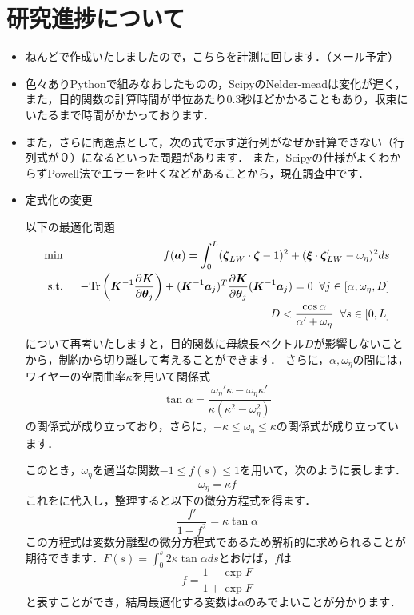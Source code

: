 \documentclass[11pt]{jsarticle}
\begin{document}
	\section{研究進捗について}
		\begin{itemize}
			\item ねんどで作成いたしましたので，こちらを計測に回します．（メール予定）
			\item 色々ありPythonで組みなおしたものの，ScipyのNelder-meadは変化が遅く，また，目的関数の計算時間が単位あたり0.3秒ほどかかることもあり，収束にいたるまで時間がかかっております．
			\item また，さらに問題点として，次の式で示す逆行列がなぜか計算できない（行列式が０）になるといった問題があります．
			また，Scipyの仕様がよくわからずPowell法でエラーを吐くなどがあることから，現在調査中です．
			\item 定式化の変更
			
			以下の最適化問題
			\begin{eqnarray}
				\min \;\; &&f(\boldsymbol{a}) = \int_{0}^{L} (\boldsymbol{\zeta}_{LW} \cdot \boldsymbol{\zeta} -1 )^2 + (\boldsymbol{\xi} \cdot \boldsymbol{\zeta}_{LW}' - \omega_{\eta})^2 ds  \\
				\mathrm{s.t.} \;\;&& -\mathrm{Tr}\left( \boldsymbol{K}^{-1} \frac{\partial \boldsymbol{K}}{\partial \boldsymbol{\theta}_{j}} \right) + (\boldsymbol{K}^{-1} \boldsymbol{a}_j)^T \frac{\partial \boldsymbol{K}}{\partial \boldsymbol{\theta}_{j}} (\boldsymbol{K}^{-1} \boldsymbol{a}_j) = 0\;\; \forall j \in [\alpha,\omega_{\eta},D] \\
				&& D<\frac{\cos \alpha}{\alpha'+\omega_{\eta}} \;\; \forall s \in [0,L]
			\end{eqnarray}
			について再考いたしますと，目的関数に母線長ベクトル$ D $が影響しないことから，制約から切り離して考えることができます．
			さらに，$ \alpha,\omega_{\eta} $の間には，ワイヤーの空間曲率$ \kappa $を用いて関係式
			\begin{equation}\label{eq:omgEta_and_alpha}
				\tan \alpha = \frac{\omega_{\eta}' \kappa - \omega_{\eta} \kappa'}{\kappa (\kappa^2 - \omega_{\eta}^2)}
			\end{equation}
			の関係式が成り立っており，さらに，$ -\kappa \leq \omega_{\eta} \leq \kappa $の関係式が成り立っています．
			
			このとき，$ \omega_{\eta} $を適当な関数$ -1 \leq f(s)  \leq 1$を用いて，次のように表します．
			\begin{equation}\label{eq:feq}
				\omega_{\eta} = \kappa f
			\end{equation}
			これをに代入し，整理すると以下の微分方程式を得ます．
			\begin{equation}\label{eq:f_ode}
				\frac{f'}{1-f^2} = \kappa \tan \alpha
			\end{equation}
			この方程式は変数分離型の微分方程式であるため解析的に求められることが期待できます．$ F(s) = \int_{0}^{s} 2 \kappa \tan \alpha ds$とおけば，$ f $は
			\begin{equation}\label{eq:f_solve}
				f = \frac{1-\exp F}{1+\exp F}
			\end{equation}
			と表すことができ，結局最適化する変数は$ \alpha $のみでよいことが分かります．
		\end{itemize}
\end{document}
